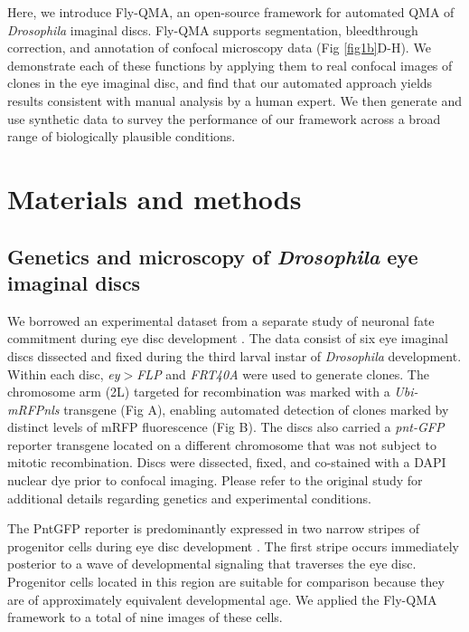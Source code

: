 \documentclass[10pt,letterpaper]{article}
\begin{document}
Here, we introduce Fly-QMA, an open-source framework for automated QMA of \textit{Drosophila} imaginal discs. Fly-QMA supports segmentation, bleedthrough correction, and annotation of confocal microscopy data (Fig \ref{fig1b}D-H). We demonstrate each of these functions by applying them to real confocal images of clones in the eye imaginal disc, and find that our automated approach yields results consistent with manual analysis by a human expert. We then generate and use synthetic data to survey the performance of our framework across a broad range of biologically plausible conditions.



\section*{Materials and methods}

\subsection*{Genetics and microscopy of \textit{Drosophila} eye imaginal discs}

We borrowed an experimental dataset from a separate study of neuronal fate commitment during eye disc development \cite{Bernasek2018}. The data consist of six eye imaginal discs dissected and fixed during the third larval instar of \textit{Drosophila} development. Within each disc, \textit{ey$>$FLP} and \textit{FRT40A} were used to generate clones. The chromosome arm (2L) targeted for recombination was marked with a \textit{Ubi-mRFPnls} transgene (Fig A), enabling automated detection of clones marked by distinct levels of mRFP fluorescence (Fig B). The discs also carried a \textit{pnt-GFP} reporter transgene located on a different chromosome that was not subject to mitotic recombination. Discs were dissected, fixed, and co-stained with a DAPI nuclear dye prior to confocal imaging. Please refer to the original study for additional details regarding genetics and experimental conditions. 

The PntGFP reporter is predominantly expressed in two narrow stripes of progenitor cells during eye disc development \cite{Bernasek2018}. The first stripe occurs immediately posterior to a wave of developmental signaling that traverses the eye disc. Progenitor cells located in this region are suitable for comparison because they are of approximately equivalent developmental age. We applied the Fly-QMA framework to a total of nine images of these cells.
\end{document}
